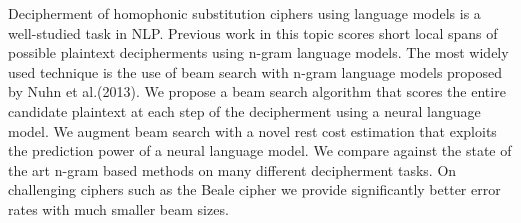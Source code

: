 Decipherment of homophonic substitution ciphers using language models is a well-studied task in NLP. Previous work in this topic scores short local spans of possible plaintext decipherments using n-gram language models. The most widely used technique is the use of beam search with n-gram language models proposed by Nuhn et al.(2013). We propose a beam search algorithm that scores the entire candidate plaintext at each step of the decipherment using a neural language model. We augment beam search with a novel rest cost estimation that exploits the prediction power of a neural language model. We compare against the state of the art n-gram based methods on many different decipherment tasks. On challenging ciphers such as the Beale cipher we provide significantly better error rates with much smaller beam sizes.
